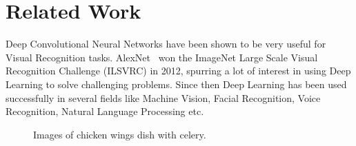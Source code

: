 \section{Related Work}

%


Deep Convolutional Neural Networks have been shown to be very useful for Visual Recognition tasks. AlexNet~\cite{krizhevsky2012imagenet} won the ImageNet Large Scale Visual Recognition Challenge (ILSVRC) in 2012, spurring a lot of interest in using Deep Learning to solve challenging problems. Since then Deep Learning has been used successfully in several fields like Machine Vision, Facial Recognition, Voice Recognition, Natural Language Processing etc.

\begin{figure} 
\centering
{} 
\caption{Images of chicken wings dish with celery.}
\label{fig:chickenwingswithcelery}
\end{figure}